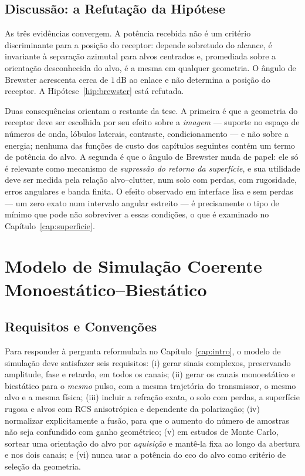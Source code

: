 \documentclass[12pt,a4paper,oneside]{book}
\theoremstyle{remark}
\newcommand{\dB}{\,\mathrm{dB}}
\theoremstyle{plain}
\theoremstyle{definition}
\begin{document}
\section{Discussão: a Refutação da Hipótese}
\label{sec:pot_discussao}

As três evidências convergem. A potência recebida não é um critério
discriminante para a posição do receptor: depende sobretudo do alcance, é
invariante à separação azimutal para alvos centrados e, promediada sobre a
orientação desconhecida do alvo, é a mesma em qualquer geometria. O ângulo de
Brewster acrescenta cerca de $1\dB$ ao enlace e não determina a posição do
receptor. A Hipótese~\ref{hip:brewster} está refutada.

Duas consequências orientam o restante da tese. A primeira é que a geometria
do receptor deve ser escolhida por seu efeito sobre a \emph{imagem} ---
suporte no espaço de números de onda, lóbulos laterais, contraste,
condicionamento --- e não sobre a energia; nenhuma das funções de custo dos
capítulos seguintes contém um termo de potência do alvo. A segunda é que o
ângulo de Brewster muda de papel: ele só é relevante como mecanismo de
\emph{supressão do retorno da superfície}, e sua utilidade deve ser medida pela
relação alvo--clutter, num solo com perdas, com rugosidade, erros angulares e
banda finita. O efeito observado em interface lisa e sem perdas --- um zero
exato num intervalo angular estreito --- é precisamente o tipo de mínimo que
pode não sobreviver a essas condições, o que é examinado no
Capítulo~\ref{cap:superficie}.

\chapter{Modelo de Simulação Coerente Monoestático--Biestático}
\label{cap:modelo}

\section{Requisitos e Convenções}
\label{sec:mod_req}

Para responder à pergunta reformulada no Capítulo~\ref{cap:intro}, o modelo de
simulação deve satisfazer seis requisitos: (i) gerar sinais complexos,
preservando amplitude, fase e retardo, em todos os canais; (ii) gerar os canais
monoestático e biestático para o \emph{mesmo} pulso, com a mesma trajetória do
transmissor, o mesmo alvo e a mesma física; (iii) incluir a refração exata, o
solo com perdas, a superfície rugosa e alvos com RCS anisotrópica e
dependente da polarização; (iv) normalizar explicitamente a fusão, para que o
aumento do número de amostras não seja confundido com ganho geométrico;
(v) em estudos de Monte Carlo, sortear uma orientação do alvo por
\emph{aquisição} e mantê-la fixa ao longo da abertura e nos dois canais; e
(vi) nunca usar a potência do eco do alvo como critério de seleção da geometria.
\end{document}
